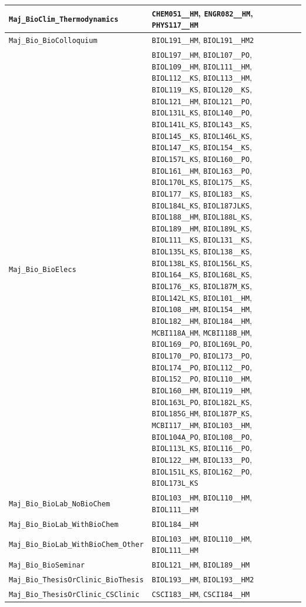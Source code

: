 \begin{longtable}{|p{4.4in}|p{4.4in}|}
    \verb|Maj_BioClim_Thermodynamics| & \verb|CHEM051__HM|, \verb|ENGR082__HM|, \verb|PHYS117__HM|\\\hline
    \verb|Maj_Bio_BioColloquium| & \verb|BIOL191__HM|, \verb|BIOL191__HM2|\\\hline
    \verb|Maj_Bio_BioElecs| & \verb|BIOL197__HM|, \verb|BIOL107__PO|, \verb|BIOL109__HM|, \verb|BIOL111__HM|, \verb|BIOL112__KS|, \verb|BIOL113__HM|, \verb|BIOL119__KS|, \verb|BIOL120__KS|, \verb|BIOL121__HM|, \verb|BIOL121__PO|, \verb|BIOL131L_KS|, \verb|BIOL140__PO|, \verb|BIOL141L_KS|, \verb|BIOL143__KS|, \verb|BIOL145__KS|, \verb|BIOL146L_KS|, \verb|BIOL147__KS|, \verb|BIOL154__KS|, \verb|BIOL157L_KS|, \verb|BIOL160__PO|, \verb|BIOL161__HM|, \verb|BIOL163__PO|, \verb|BIOL170L_KS|, \verb|BIOL175__KS|, \verb|BIOL177__KS|, \verb|BIOL183__KS|, \verb|BIOL184L_KS|, \verb|BIOL187JLKS|, \verb|BIOL188__HM|, \verb|BIOL188L_KS|, \verb|BIOL189__HM|, \verb|BIOL189L_KS|, \verb|BIOL111__KS|, \verb|BIOL131__KS|, \verb|BIOL135L_KS|, \verb|BIOL138__KS|, \verb|BIOL138L_KS|, \verb|BIOL156L_KS|, \verb|BIOL164__KS|, \verb|BIOL168L_KS|, \verb|BIOL176__KS|, \verb|BIOL187M_KS|, \verb|BIOL142L_KS|, \verb|BIOL101__HM|, \verb|BIOL108__HM|, \verb|BIOL154__HM|, \verb|BIOL182__HM|, \verb|BIOL184__HM|, \verb|MCBI118A_HM|, \verb|MCBI118B_HM|, \verb|BIOL169__PO|, \verb|BIOL169L_PO|, \verb|BIOL170__PO|, \verb|BIOL173__PO|, \verb|BIOL174__PO|, \verb|BIOL112__PO|, \verb|BIOL152__PO|, \verb|BIOL110__HM|, \verb|BIOL160__HM|, \verb|BIOL119__HM|, \verb|BIOL163L_PO|, \verb|BIOL182L_KS|, \verb|BIOL185G_HM|, \verb|BIOL187P_KS|, \verb|MCBI117__HM|, \verb|BIOL103__HM|, \verb|BIOL104A_PO|, \verb|BIOL108__PO|, \verb|BIOL113L_KS|, \verb|BIOL116__PO|, \verb|BIOL122__HM|, \verb|BIOL133__PO|, \verb|BIOL151L_KS|, \verb|BIOL162__PO|, \verb|BIOL173L_KS|\\\hline
    \verb|Maj_Bio_BioLab_NoBioChem| & \verb|BIOL103__HM|, \verb|BIOL110__HM|, \verb|BIOL111__HM|\\\hline
    \verb|Maj_Bio_BioLab_WithBioChem| & \verb|BIOL184__HM|\\\hline
    \verb|Maj_Bio_BioLab_WithBioChem_Other| & \verb|BIOL103__HM|, \verb|BIOL110__HM|, \verb|BIOL111__HM|\\\hline
    \verb|Maj_Bio_BioSeminar| & \verb|BIOL121__HM|, \verb|BIOL189__HM|\\\hline
    \verb|Maj_Bio_ThesisOrClinic_BioThesis| & \verb|BIOL193__HM|, \verb|BIOL193__HM2|\\\hline
    \verb|Maj_Bio_ThesisOrClinic_CSClinic| & \verb|CSCI183__HM|, \verb|CSCI184__HM|\\\hline

\end{longtable}
